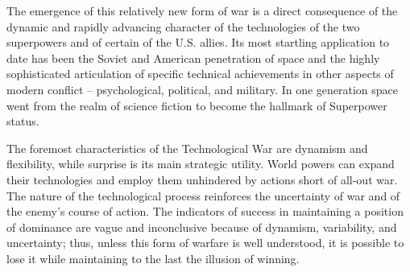The emergence of this relatively new form of war is a direct consequence of the dynamic and rapidly advancing character of the technologies of the two superpowers and of certain of the U.S. allies. Its most startling application to date has been the Soviet and American penetration of space and the highly sophisticated articulation of specific technical achievements in other aspects of modern conflict -- psychological, political, and military. In one generation space went from the realm of science fiction to become the hallmark of Superpower status.

The foremost characteristics of the Technological War are dynamism and flexibility, while surprise is its main strategic utility. World powers can expand their technologies and employ them unhindered by actions short of all-out war. The nature of the technological process reinforces the uncertainty of war and of the enemy's course of action. The indicators of success in maintaining a position of dominance are vague and inconclusive because of dynamism, variability, and uncertainty; thus, unless this form of warfare is well understood, it is possible to lose it while maintaining to the last the illusion of winning.

